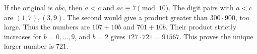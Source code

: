 If the original is $\overline{abc}$, then $a<c$ and $ac\equiv7\pmod{10}$. The digit pairs with $a<c$ are $(1,7),(3,9)$. The second would give a product greater than $300\cdot900$, too large. Thus the numbers are $107+10b$ and $701+10b$. Their product strictly increases for $b=0,\ldots,9$, and $b=2$ gives $127\cdot721=91567$. This proves the unique larger number is $\boxed{721}$.
